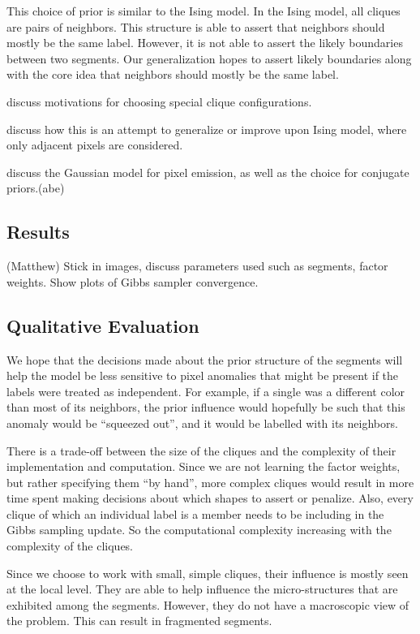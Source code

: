 \documentclass[12pt]{article}
\begin{document}
This choice of prior is similar to the Ising model. In the Ising model, all
cliques are pairs of neighbors. This structure is able to assert that neighbors
should mostly be the same label. However, it is not able to assert the likely
boundaries between two segments. Our generalization hopes to assert likely
boundaries along with the core idea that neighbors should mostly be the same
label.

discuss motivations for choosing special clique configurations. 

discuss how this is an attempt to generalize or improve upon Ising model, where
only adjacent pixels are considered.

discuss the Gaussian model for pixel emission, as well as the choice for conjugate priors.(abe)

\subsection*{Results}(Matthew)
Stick in images, discuss parameters used such as segments, factor weights.
Show plots of Gibbs sampler convergence.


\subsection*{Qualitative Evaluation}
We hope that the decisions made about the prior structure of the segments will
help the model be less sensitive to pixel anomalies that might be present if
the labels were treated as independent. For example, if a single was a
different color than most of its neighbors, the prior influence would hopefully
be such that this anomaly would be ``squeezed out'', and it would be labelled
with its neighbors.

There is a trade-off between the size of the cliques and the complexity of their
implementation and computation. Since we are not learning the factor weights,
but rather specifying them ``by hand'', more complex cliques would result in
more time spent making decisions about which shapes to assert or penalize.
Also, every clique of which an individual label is a member needs to be
including in the Gibbs sampling update. So the computational complexity
increasing with the complexity of the cliques.

Since we choose to work with small, simple cliques, their influence is mostly
seen at the local level. They are able to help influence the micro-structures
that are exhibited among the segments. However, they do not have a macroscopic
view of the problem. This can result in fragmented segments.
\end{document}
